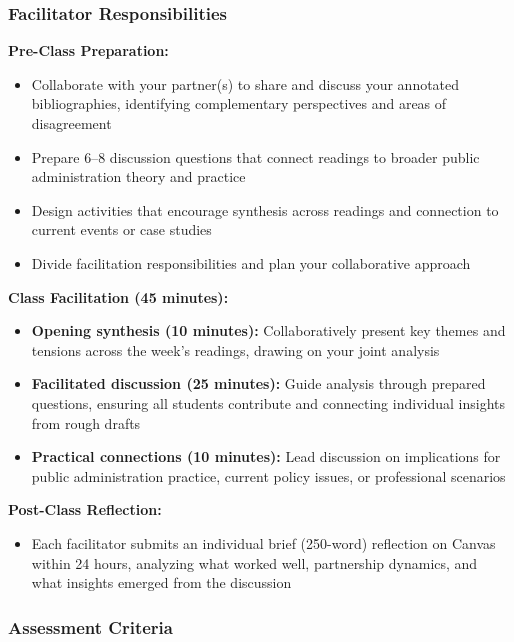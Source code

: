 \documentclass[11pt]{article}     %
\begin{document}
\subsubsection*{Facilitator Responsibilities}

\textbf{Pre-Class Preparation:}
\begin{itemize}
    \item Collaborate with your partner(s) to share and discuss your annotated bibliographies, identifying complementary perspectives and areas of disagreement
    \item Prepare 6--8 discussion questions that connect readings to broader public administration theory and practice
    \item Design activities that encourage synthesis across readings and connection to current events or case studies
    \item Divide facilitation responsibilities and plan your collaborative approach
\end{itemize}

\textbf{Class Facilitation (45 minutes):}
\begin{itemize}
    \item \textbf{Opening synthesis (10 minutes):} Collaboratively present key themes and tensions across the week's readings, drawing on your joint analysis
    \item \textbf{Facilitated discussion (25 minutes):} Guide analysis through prepared questions, ensuring all students contribute and connecting individual insights from rough drafts
    \item \textbf{Practical connections (10 minutes):} Lead discussion on implications for public administration practice, current policy issues, or professional scenarios
\end{itemize}

\textbf{Post-Class Reflection:}
\begin{itemize}
    \item Each facilitator submits an individual brief (250-word) reflection on Canvas within 24 hours, analyzing what worked well, partnership dynamics, and what insights emerged from the discussion
\end{itemize}

\subsubsection*{Assessment Criteria}
\end{document}
